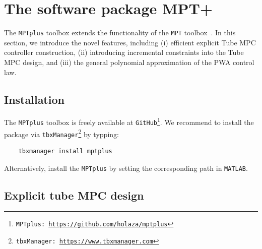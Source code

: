 \documentclass[letterpaper, 10 pt, conference]{ieeeconf}
\begin{document}
\section{The software package MPT+}
\label{sec:code}



The \texttt{MPTplus} toolbox extends the functionality of the \texttt{MPT} toolbox~\cite{MPT3}. In this section, we introduce the novel features, including (i) efficient explicit Tube MPC controller construction, (ii) introducing incremental constraints into the Tube MPC design, and (iii) the general polynomial approximation of the PWA control law. 

\subsection{Installation}
\label{sec:installation}

The \texttt{MPTplus} toolbox is freely available at \texttt{GitHub}\footnote{\texttt{MPTplus: \url{https://github.com/holaza/mptplus}}}. We recommend to install the package via \texttt{tbxManager}\footnote{\texttt{tbxManager: \url{https://www.tbxmanager.com}}} by typping:
\begin{verbatim}
	tbxmanager install mptplus
\end{verbatim} 
Alternatively, install the \texttt{MPTplus} by setting the corresponding path in \texttt{MATLAB}. 


\subsection{Explicit tube MPC design}
\label{sec:mptplus_tube_mpc}
\end{document}
